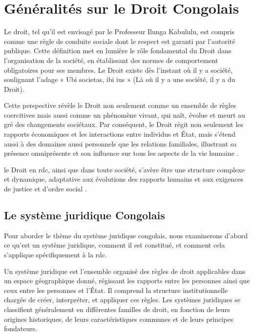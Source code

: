 \newpage
\section{Généralités sur le Droit Congolais}
\label{ch:1:section:introduction-law}

Le droit, tel qu'il est envisagé par le Professeur Ilunga Kabululu, est compris comme une règle de conduite sociale dont le respect est garanti par l'autorité publique. Cette définition met en lumière le rôle fondamental du Droit dans l'organisation de la société, en établissant des normes de comportement obligatoires pour ses membres. Le Droit existe dès l'instant où il y a société, soulignant l'adage « Ubi societas, ibi ius » (Là où il y a une société, il y a du Droit).

Cette perspective révèle le Droit non seulement comme un ensemble de règles coercitives mais aussi comme un phénomène vivant, qui naît, évolue et meurt au gré des changements sociétaux. Par conséquent, le Droit régit non seulement les rapports économiques et les interactions entre individus et État, mais s'étend aussi à des domaines aussi personnels que les relations familiales, illustrant sa présence omniprésente et son influence sur tous les aspects de la vie humaine  \cite{Etienne_2012}.

le Droit en \ac{rdc}, ainsi que dans toute société, s'avère être une structure complexe et dynamique, adaptative aux évolutions des rapports humains et aux exigences de justice et d'ordre social \cite{Etienne_2012}.

\subsection{Le système juridique Congolais \cite{joel_21AD}}
Pour aborder le thème du système juridique congolais, nous examinerons d'abord ce qu'est un système juridique, comment il est constitué, et comment cela s'applique spécifiquement à la \acf{rdc}. 

Un système juridique est l'ensemble organisé des règles de droit applicables dans un espace géographique donné, régissant les rapports entre les personnes ainsi que ceux entre les personnes et l'État. Il comprend la structure institutionnelle chargée de créer, interpréter, et appliquer ces règles. Les systèmes juridiques se classifient généralement en différentes familles de droit, en fonction de leurs origines historiques, de leurs caractéristiques communes et de leurs principes fondateurs.


